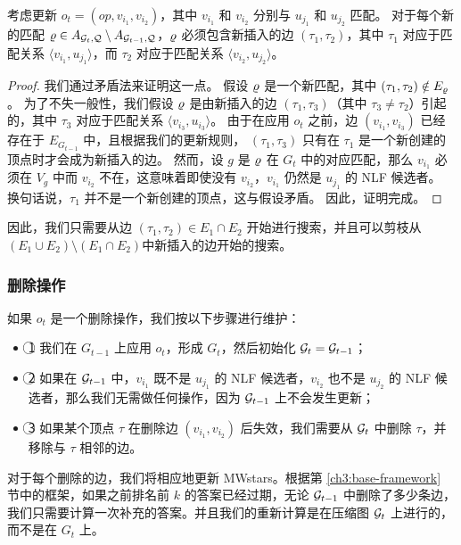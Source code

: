 \begin{theorem} \label{theorem:only-one-edge-to-search}
    考虑更新 $o_t = (op, v_{i_1}, v_{i_2})$，其中 $v_{i_1}$ 和 $v_{i_2}$ 分别与 $u_{j_1}$ 和 $u_{j_2}$ 匹配。
    对于每个新的匹配 $\varrho \in A_{\mathcal{G}_t, \mathcal{Q}} \setminus A_{\mathcal{G}_{t-1}, \mathcal{Q}}$，$\varrho$ 必须包含新插入的边 $(\tau_1, \tau_2)$，其中 $\tau_1$ 对应于匹配关系 $\langle v_{i_1}, u_{j_1} \rangle$，而 $\tau_2$ 对应于匹配关系 $\langle v_{i_2}, u_{j_2} \rangle$。
\end{theorem}

\begin{proof}
    我们通过矛盾法来证明这一点。
    假设 $\varrho$ 是一个新匹配，其中 $(\tau_1, \tau_2) \notin E_{\varrho}$。
    为了不失一般性，我们假设 $\varrho$ 是由新插入的边 $(\tau_1, \tau_3)$（其中 $\tau_3 \neq \tau_2$）引起的，其中 $\tau_3$ 对应于匹配关系 $\langle v_{i_3}, u_{i_3} \rangle$。
    由于在应用 $o_t$ 之前，边 $(v_{i_1}, v_{i_3})$ 已经存在于 $E_{G_{t-1}}$ 中，且根据我们的更新规则，
    $(\tau_1, \tau_3)$ 只有在 $\tau_1$ 是一个新创建的顶点时才会成为新插入的边。
    然而，设 $g$ 是 $\varrho$ 在 $G_t$ 中的对应匹配，那么 $v_{i_1}$ 必须在 $V_g$ 中而 $v_{i_2}$ 不在，这意味着即使没有 $v_{i_2}$，$v_{i_1}$ 仍然是 $u_{j_1}$ 的 NLF 候选者。
    换句话说，$\tau_1$ 并不是一个新创建的顶点，这与假设矛盾。
    因此，证明完成。
\end{proof}

因此，我们只需要从边 $(\tau_1, \tau_2) \in E_1 \cap E_2$ 开始进行搜索，并且可以剪枝从$(E_1 \cup E_2) \setminus (E_1 \cap E_2)$中新插入的边开始的搜索。

\subsubsection{删除操作}
如果 $o_t$ 是一个删除操作，我们按以下步骤进行维护：
\begin{itemize}
\item \textcircled{1} 我们在 $G_{t-1}$ 上应用 $o_t$，形成 $G_t$，然后初始化 $\mathcal{G}_t = \mathcal{G}_{t-1}$；
\item \textcircled{2} 如果在 $\mathcal{G}_{t-1}$ 中，$v_{i_1}$ 既不是 $u_{j_1}$ 的 NLF 候选者，$v_{i_2}$ 也不是 $u_{j_2}$ 的 NLF 候选者，那么我们无需做任何操作，因为 $\mathcal{G}_{t-1}$ 上不会发生更新；
\item \textcircled{3} 如果某个顶点 $\tau$ 在删除边 $(v_{i_1}, v_{i_2})$ 后失效，我们需要从 $\mathcal{G}_t$ 中删除 $\tau$，并移除与 $\tau$ 相邻的边。
\end{itemize}

对于每个删除的边，我们将相应地更新 MWstars。根据第 \ref{ch3:base-framework} 节中的框架，如果之前排名前 $k$ 的答案已经过期，无论 $\mathcal{G}_{t-1}$ 中删除了多少条边，我们只需要计算一次补充的答案。并且我们的重新计算是在压缩图 $\mathcal{G}_t$ 上进行的，而不是在 $G_t$ 上。

